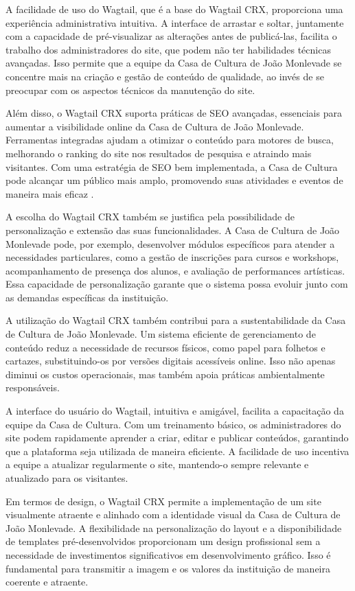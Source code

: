A facilidade de uso do Wagtail, que é a base do Wagtail CRX, proporciona uma experiência administrativa intuitiva. A interface de arrastar e soltar, juntamente com a capacidade de pré-visualizar as alterações antes de publicá-las, facilita o trabalho dos administradores do site, que podem não ter habilidades técnicas avançadas. Isso permite que a equipe da Casa de Cultura de João Monlevade se concentre mais na criação e gestão de conteúdo de qualidade, ao invés de se preocupar com os aspectos técnicos da manutenção do site.

Além disso, o Wagtail CRX suporta práticas de \ac{SEO} avançadas, essenciais para aumentar a visibilidade online da Casa de Cultura de João Monlevade. Ferramentas integradas ajudam a otimizar o conteúdo para motores de busca, melhorando o ranking do site nos resultados de pesquisa e atraindo mais visitantes. Com uma estratégia de \ac{SEO} bem implementada, a Casa de Cultura pode alcançar um público mais amplo, promovendo suas atividades e eventos de maneira mais eficaz \cite{WagtailCRXSEO}.

A escolha do Wagtail CRX também se justifica pela possibilidade de personalização e extensão das suas funcionalidades. A Casa de Cultura de João Monlevade pode, por exemplo, desenvolver módulos específicos para atender a necessidades particulares, como a gestão de inscrições para cursos e workshops, acompanhamento de presença dos alunos, e avaliação de performances artísticas. Essa capacidade de personalização garante que o sistema possa evoluir junto com as demandas específicas da instituição.

A utilização do Wagtail CRX também contribui para a sustentabilidade da Casa de Cultura de João Monlevade. Um sistema eficiente de gerenciamento de conteúdo reduz a necessidade de recursos físicos, como papel para folhetos e cartazes, substituindo-os por versões digitais acessíveis online. Isso não apenas diminui os custos operacionais, mas também apoia práticas ambientalmente responsáveis.

A interface do usuário do Wagtail, intuitiva e amigável, facilita a capacitação da equipe da Casa de Cultura. Com um treinamento básico, os administradores do site podem rapidamente aprender a criar, editar e publicar conteúdos, garantindo que a plataforma seja utilizada de maneira eficiente. A facilidade de uso incentiva a equipe a atualizar regularmente o site, mantendo-o sempre relevante e atualizado para os visitantes.

Em termos de design, o Wagtail CRX permite a implementação de um site visualmente atraente e alinhado com a identidade visual da Casa de Cultura de João Monlevade. A flexibilidade na personalização do layout e a disponibilidade de templates pré-desenvolvidos proporcionam um design profissional sem a necessidade de investimentos significativos em desenvolvimento gráfico. Isso é fundamental para transmitir a imagem e os valores da instituição de maneira coerente e atraente.

